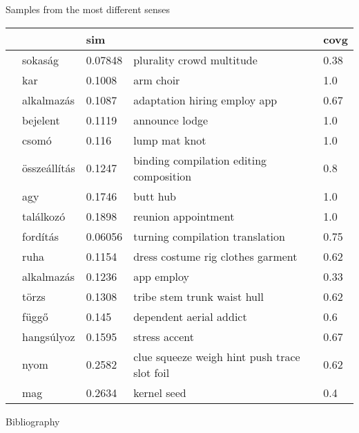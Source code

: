 \documentclass[10pt]{beamer}%
\newcommand{\adagram}{\texttt{AdaGram}}
\newcommand{\mutli}{\texttt{mutli}}
\begin{document}
\begin{frame}{Samples from the most different senses}
	\small
		\begin{longtable}{lllll}
			\toprule
			& & sim & & covg \\
			\midrule
			\multirow{8}{*}{\rotatebox[origin=c]{90}{\mutli~``context vs''}}
			&sokaság	& 0.07848	& plurality crowd multitude	& 0.38 \\
			&kar	& 0.1008	& arm choir	& 1.0 \\
			&alkalmazás	& 0.1087	& adaptation hiring employ app	& 0.67 \\
			&bejelent	& 0.1119	& announce lodge	& 1.0 \\
			&csomó	& 0.116	& lump mat knot	& 1.0 \\
			&összeállítás	& 0.1247	& binding compilation editing composition	& 0.8 \\
			&agy	& 0.1746	& butt hub	& 1.0 \\
			&találkozó	& 0.1898	& reunion appointment	& 1.0 \\
			\midrule
			\multirow{8}{*}{\rotatebox[origin=c]{90}{\adagram}}
			&fordítás	& 0.06056	& turning compilation translation	& 0.75 \\
			&ruha	& 0.1154	& dress costume rig clothes garment	& 0.62 \\
			&alkalmazás	& 0.1236	& app employ	& 0.33 \\
			&törzs	& 0.1308	& tribe stem trunk waist hull	& 0.62 \\
			&függő	& 0.145	& dependent aerial addict	& 0.6 \\
			&hangsúlyoz	& 0.1595	& stress accent	& 0.67 \\
			&nyom	& 0.2582	& clue squeeze weigh hint push trace slot foil	& 0.62 \\
			&mag	& 0.2634	& kernel seed	& 0.4 \\ 
			\bottomrule
		\end{longtable}
\end{frame}
\begin{frame} [allowframebreaks] {Bibliography}
	\printbibliography
\end{frame}
\end{document}
